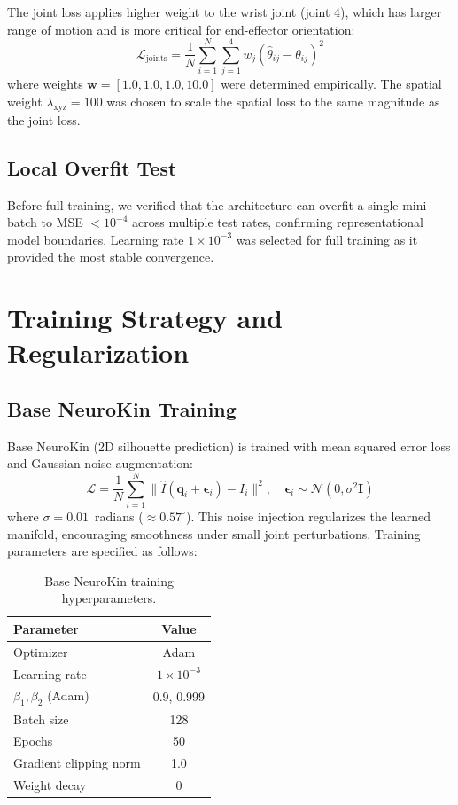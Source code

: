 \documentclass[12pt,a4paper,oneside]{report}
\begin{document}
The joint loss applies higher weight to the wrist joint (joint 4), which has larger range of motion and is more critical for end-effector orientation:
\begin{equation}
\mathcal{L}_{\text{joints}} = \frac{1}{N} \sum_{i=1}^{N} \sum_{j=1}^{4} w_j (\hat{\theta}_{ij} - \theta_{ij})^2
\end{equation}
where weights $\mathbf{w} = [1.0, 1.0, 1.0, 10.0]$ were determined empirically. The spatial weight $\lambda_{\text{xyz}} = 100$ was chosen to scale the spatial loss to the same magnitude as the joint loss.

\subsection{Local Overfit Test}
Before full training, we verified that the architecture can overfit a single mini-batch to MSE $< 10^{-4}$ across multiple test rates, confirming representational model boundaries. Learning rate $1 \times 10^{-3}$ was selected for full training as it provided the most stable convergence.

\section{Training Strategy and Regularization}
\label{sec:training_strategy_decoder}

\subsection{Base NeuroKin Training}
Base NeuroKin (2D silhouette prediction) is trained with mean squared error loss and Gaussian noise augmentation:
\begin{equation}
\mathcal{L} = \frac{1}{N} \sum_{i=1}^{N} \|\hat{I}(\mathbf{q}_i + \boldsymbol{\epsilon}_i) - I_i\|^2, \quad \boldsymbol{\epsilon}_i \sim \mathcal{N}(0, \sigma^2 \mathbf{I})
\end{equation}
where $\sigma = 0.01$~radians ($\approx 0.57^\circ$). This noise injection regularizes the learned manifold, encouraging smoothness under small joint perturbations. Training parameters are specified as follows:

\begin{table}[H]
\centering
\caption{Base NeuroKin training hyperparameters.}
\label{tab:neurokin_hyperparams}
\begin{tabular}{lc}
\toprule
\textbf{Parameter} & \textbf{Value} \\
\midrule
Optimizer & Adam \\
Learning rate & $1 \times 10^{-3}$ \\
$\beta_1, \beta_2$ (Adam) & 0.9, 0.999 \\
Batch size & 128 \\
Epochs & 50 \\
Gradient clipping norm & 1.0 \\
Weight decay & 0 \\
\bottomrule
\end{tabular}
\end{table}
\end{document}
